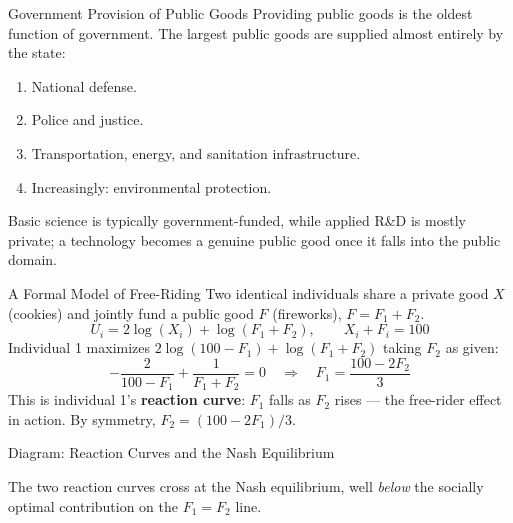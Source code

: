 \documentclass[11pt,aspectratio=169]{beamer}
\begin{document}
\begin{frame}{Government Provision of Public Goods}
  Providing public goods is the oldest function of government. The largest public goods are supplied almost entirely by the state:
  \begin{enumerate}
    \item National defense.
    \item Police and justice.
    \item Transportation, energy, and sanitation infrastructure.
    \item Increasingly: environmental protection.
  \end{enumerate}
  \vspace{0.3em}
  \small Basic science is typically government-funded, while applied R\&D is mostly private; a technology becomes a genuine public good once it falls into the public domain.
\end{frame}

\begin{frame}{A Formal Model of Free-Riding}
  Two identical individuals share a private good $X$ (cookies) and jointly fund a public good $F$ (fireworks), $F = F_1 + F_2$.
  \[ U_i = 2\log(X_i) + \log(F_1+F_2), \qquad X_i + F_i = 100 \]
  Individual 1 maximizes $2\log(100-F_1) + \log(F_1+F_2)$ taking $F_2$ as given:
  \[ -\frac{2}{100-F_1} + \frac{1}{F_1+F_2} = 0 \quad\Rightarrow\quad F_1 = \frac{100-2F_2}{3} \]
  \small This is individual 1's \textbf{reaction curve}: $F_1$ falls as $F_2$ rises --- the free-rider effect in action. By symmetry, $F_2 = (100-2F_1)/3$.
\end{frame}

\begin{frame}{Diagram: Reaction Curves and the Nash Equilibrium}
  \begin{center}
  \end{center}
  \footnotesize The two reaction curves cross at the Nash equilibrium, well \emph{below} the socially optimal contribution on the $F_1{=}F_2$ line.
\end{frame}
\end{document}
